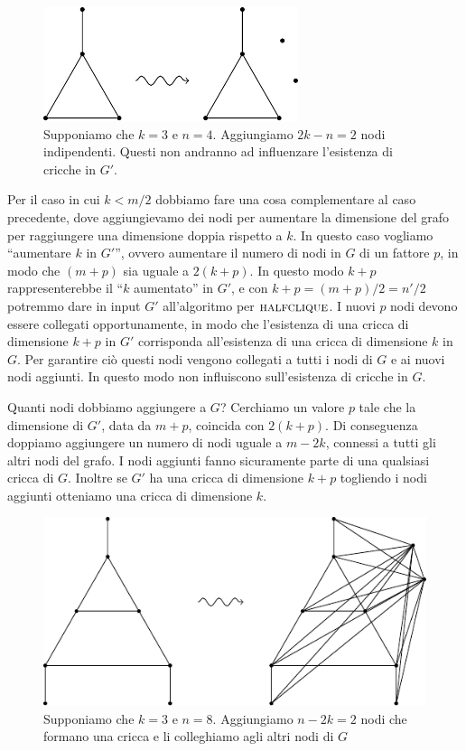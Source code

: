 \begin{figure}[h]
    \begin{center}
        \includegraphics{./img/NPClass/CLIHCLI1.pdf}
        \caption{Supponiamo che $k=3$ e $n=4$. Aggiungiamo $2k-n = 2$ nodi indipendenti. Questi non
        andranno ad influenzare l'esistenza di cricche in $G'$.}
    \end{center}
\end{figure}

Per il caso in cui $k < m/2$ dobbiamo fare una cosa complementare al caso precedente, dove
aggiungievamo dei nodi per aumentare la dimensione del grafo per raggiungere una dimensione doppia
rispetto a $k$. In questo caso vogliamo ``aumentare $k$ in $G'$'', ovvero aumentare il numero di
nodi in $G$ di un fattore $p$, in modo che $(m+p)$ sia uguale a $2(k+p)$. In questo modo $k + p$
rappresenterebbe il ``$k$ aumentato'' in $G'$, e con $k+p = (m+p)/2 = n'/2$ potremmo dare in input
$G'$ all'algoritmo per $\textsc{halfclique}$. I nuovi $p$ nodi devono essere collegati opportunamente, in
modo che l'esistenza di una cricca di dimensione $k+p$ in $G'$ corrisponda all'esistenza di una
cricca di dimensione $k$ in $G$. Per garantire ciò questi nodi vengono collegati a tutti i nodi di
$G$ e ai nuovi nodi aggiunti. In questo modo non influiscono sull'esistenza di cricche in $G$.

Quanti nodi dobbiamo aggiungere a $G$? Cerchiamo un valore $p$ tale che la dimensione di $G'$, data
da $m + p$, coincida con $2(k + p)$. Di conseguenza doppiamo aggiungere un numero di nodi uguale a
$m - 2k$, connessi a tutti gli altri nodi del grafo. I nodi aggiunti fanno sicuramente parte di una
qualsiasi cricca di $G$. Inoltre se $G'$ ha una cricca di dimensione $k+p$ togliendo i nodi aggiunti
otteniamo una cricca di dimensione $k$.

\begin{figure}[h]
    \begin{center}
        \includegraphics{./img/NPClass/CLIHCLI2.pdf}
        \caption{Supponiamo che $k=3$ e $n=8$. Aggiungiamo $n-2k = 2$ nodi che formano una cricca e
            li colleghiamo agli altri nodi di $G$}
    \end{center}
\end{figure}

